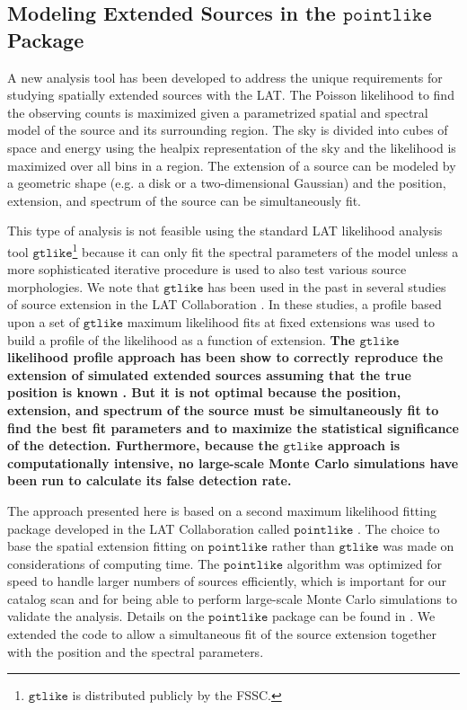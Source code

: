 \documentclass[12pt,preprint]{aastex}
\newcommand{\gtlike}{\ensuremath{\mathtt{gtlike}}\xspace}
\newcommand{\pointlike}{\ensuremath{\mathtt{pointlike}}\xspace}
\newcommand{\newtext}[1]{{\bfseries \color{red}#1}}
\begin{document}
\subsection{Modeling Extended Sources in the \pointlike Package}

A new analysis tool has been developed to address the unique requirements
for studying spatially extended sources with the LAT.
The Poisson likelihood to find
the observing counts is maximized given a parametrized spatial and
spectral model of the source and its surrounding region.  The sky is
divided into cubes of space and energy using the healpix representation
of the sky \citep{healpix} and the likelihood is maximized over all bins
in a region.  The extension of a source can be modeled by a geometric
shape (e.g. a disk or a two-dimensional Gaussian) and the position, extension,
and spectrum of the source
can be simultaneously fit.

This type of analysis is not feasible using the standard LAT likelihood
analysis tool \gtlike\footnote{\gtlike is distributed publicly by the
FSSC.} because it can only fit the spectral parameters of the model
unless a more sophisticated iterative procedure is used to also test
various source morphologies.  We note that \gtlike has been used in the
past in several studies of source extension in the LAT Collaboration
\citep{lmc,smc,w28,w51c}.  In these studies, a profile based upon a
set of \gtlike maximum likelihood fits at fixed extensions was used
to build a profile of the likelihood as a function of extension.
\newtext{
The \gtlike likelihood profile approach has been show to correctly
reproduce the extension of simulated extended sources assuming that the
true position is known \citep{francesco_2011}.  But it is not optimal
because the position, extension, and spectrum of the source must be
simultaneously fit to find the best fit parameters and to maximize the
statistical significance of the detection.  Furthermore, because the \gtlike
approach is computationally intensive, no large-scale Monte Carlo
simulations have been run to calculate its false detection rate.
}

The approach presented here is based on a second maximum likelihood
fitting package developed in the LAT Collaboration called \pointlike
\citep{first_cat,matthew_kerr_thesis}.  The choice to base the
spatial extension fitting on \pointlike rather than \gtlike was made
on considerations of computing time.  The \pointlike algorithm was
optimized for speed to handle larger numbers of sources efficiently,
which is important for our catalog scan and for being able
to perform large-scale Monte Carlo simulations to validate the analysis.
Details on the \pointlike package can be
found in \cite{matthew_kerr_thesis}.  We extended the code to allow a
simultaneous fit of the source extension together with the position and
the spectral parameters.
\end{document}
